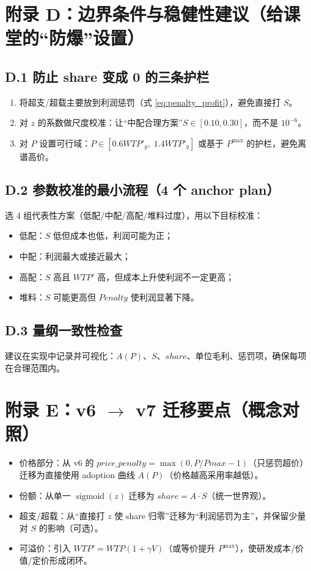 \documentclass[UTF8,12pt]{ctexart}
\DeclareMathOperator{\sigmoid}{sigmoid}
\begin{document}
\section{附录 D：边界条件与稳健性建议（给课堂的“防爆”设置）}

\subsection{D.1 防止 share 变成 0 的三条护栏}
\begin{enumerate}
  \item 将超支/超载主要放到利润惩罚（式 \eqref{eq:penalty_profit}），避免直接打 $S$。
  \item 对 $z$ 的系数做尺度校准：让“中配合理方案”$S\in[0.10,0.30]$，而不是 $10^{-6}$。
  \item 对 $P$ 设置可行域：$P\in[0.6WTP'_g,\;1.4WTP'_g]$ 或基于 $P^{\max}$ 的护栏，避免离谱高价。
\end{enumerate}

\subsection{D.2 参数校准的最小流程（4 个 anchor plan）}
选 4 组代表性方案（低配/中配/高配/堆料过度），用以下目标校准：
\begin{itemize}
  \item 低配：$S$ 低但成本也低，利润可能为正；
  \item 中配：利润最大或接近最大；
  \item 高配：$S$ 高且 $WTP'$ 高，但成本上升使利润不一定更高；
  \item 堆料：$S$ 可能更高但 $Penalty$ 使利润显著下降。
\end{itemize}

\subsection{D.3 量纲一致性检查}
建议在实现中记录并可视化：$A(P)$、$S$、$share$、单位毛利、惩罚项，确保每项在合理范围内。

\section{附录 E：v6 $\rightarrow$ v7 迁移要点（概念对照）}
\begin{itemize}
  \item 价格部分：从 v6 的 $price\_penalty=\max(0,P/Pmax-1)$（只惩罚超价）
        迁移为直接使用 adoption 曲线 $A(P)$（价格越高采用率越低）。
  \item 份额：从单一 $\sigmoid(z)$ 迁移为 $share=A\cdot S$（统一世界观）。
  \item 超支/超载：从“直接打 $z$ 使 share 归零”迁移为“利润惩罚为主”，并保留少量对 $S$ 的影响（可选）。
  \item 可溢价：引入 $WTP'=WTP(1+\gamma V)$（或等价提升 $P^{\max}$），使研发成本/价值/定价形成闭环。
\end{itemize}
\end{document}
